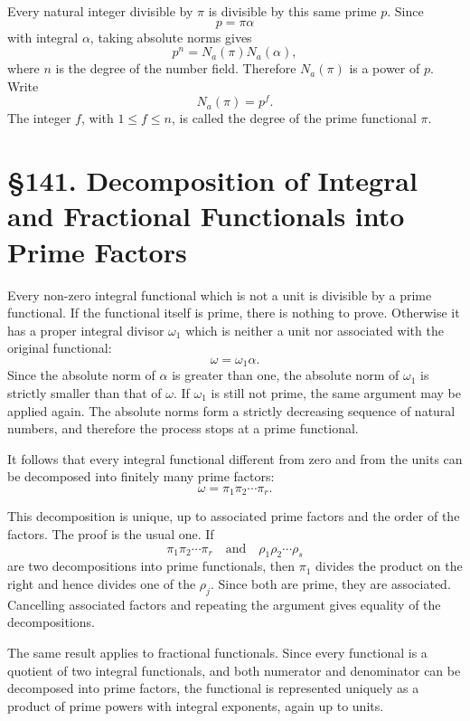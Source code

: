 \documentclass[12pt,a4paper]{article}
\newcommand{\webersection}[2]{\clearpage\section*{\S #1. #2}}
\begin{document}
Every natural integer divisible by \(\pi\) is divisible by this same prime \(p\).  Since
\begin{equation}
 p=\pi\alpha \tag{1}
\end{equation}
with integral \(\alpha\), taking absolute norms gives
\begin{equation}
 p^n=N_a(\pi)N_a(\alpha), \tag{2}
\end{equation}
where \(n\) is the degree of the number field.  Therefore \(N_a(\pi)\) is a power of \(p\).  Write
\begin{equation}
 N_a(\pi)=p^f. \tag{3}
\end{equation}
The integer \(f\), with \(1\leq f\leq n\), is called the degree of the prime functional \(\pi\).

\webersection{141}{Decomposition of Integral and Fractional Functionals into Prime Factors}

Every non-zero integral functional which is not a unit is divisible by a prime functional.  If the functional itself is prime, there is nothing to prove.  Otherwise it has a proper integral divisor \(\omega_1\) which is neither a unit nor associated with the original functional:
\[
 \omega=
\omega_1\alpha.
\]
Since the absolute norm of \(\alpha\) is greater than one, the absolute norm of \(\omega_1\) is strictly smaller than that of \(\omega\).  If \(\omega_1\) is still not prime, the same argument may be applied again.  The absolute norms form a strictly decreasing sequence of natural numbers, and therefore the process stops at a prime functional.

It follows that every integral functional different from zero and from the units can be decomposed into finitely many prime factors:
\begin{equation}
 \omega=\pi_1\pi_2\cdots\pi_r. \tag{1}
\end{equation}

This decomposition is unique, up to associated prime factors and the order of the factors.  The proof is the usual one.  If
\[
 \pi_1\pi_2\cdots\pi_r
\quad \text{and}\quad
 \rho_1\rho_2\cdots\rho_s
\]
are two decompositions into prime functionals, then \(\pi_1\) divides the product on the right and hence divides one of the \(\rho_j\).  Since both are prime, they are associated.  Cancelling associated factors and repeating the argument gives equality of the decompositions.

The same result applies to fractional functionals.  Since every functional is a quotient of two integral functionals, and both numerator and denominator can be decomposed into prime factors, the functional is represented uniquely as a product of prime powers with integral exponents, again up to units.
\end{document}
